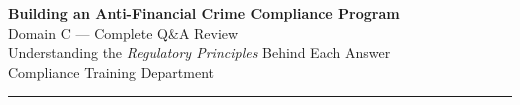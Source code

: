 \documentclass[12pt,aspectratio=169]{beamer}
\begin{document}
	
	\begin{frame}
		\centering
		\vspace{0.8cm}
		{\fontsize{16}{19}\selectfont \textbf{Building an Anti-Financial Crime Compliance Program}}\\[0.15cm]
		{\fontsize{12}{14}\selectfont Domain C — Complete Q\&A Review}\\[0.3cm]
		{\fontsize{9}{11}\selectfont Understanding the \textit{Regulatory Principles} Behind Each Answer}\\[0.3cm]
		{\fontsize{8}{10}\selectfont Compliance Training Department}
		\vspace{0.2cm}
		\rule{4cm}{0.5pt}
	\end{frame}
	
\end{document}
